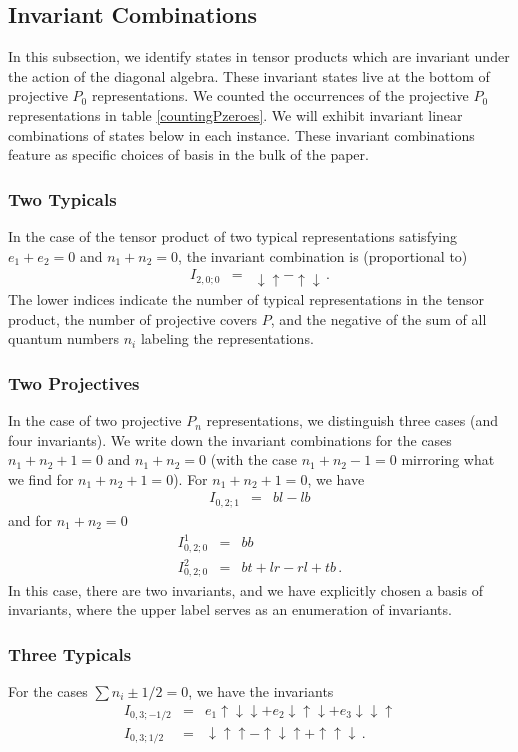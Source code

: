 \documentclass[12pt]{article}
\numberwithin{equation}{section}
\numberwithin{equation}{section}
\numberwithin{table}{section}\setlength{\multlinegap}{25pt}
\begin{document}
\subsection{Invariant Combinations}
\label{topandinvariants}
In this subsection, we identify states in tensor products which are invariant under the action of the diagonal
algebra. These invariant states live at the bottom of projective $P_0$ representations.  We counted the
occurrences of the projective $P_0$ representations in table \ref{countingPzeroes}. We will exhibit 
invariant linear combinations of states below in each instance. These invariant combinations feature as  specific choices of basis in
the bulk of the paper.
\subsubsection{Two Typicals}
In the case of the tensor product of two typical representations satisfying $e_1+e_2=0$
and $n_1+n_2=0$, the invariant combination is (proportional to)
\begin{eqnarray}
I_{2,0;0} &=& \downarrow \uparrow - \uparrow \downarrow \, .
\end{eqnarray}
The lower indices indicate the number of typical representations in the tensor product, the number of 
projective covers $P$, and the negative of the sum of all quantum numbers $n_i$ labeling the representations.
\subsubsection{Two Projectives}
In the case of two projective $P_n$ representations, we distinguish three cases (and four invariants). We write down the invariant combinations
for the cases $n_1+n_2+1=0$ and $n_1+n_2=0$ (with the case $n_1+n_2-1=0$ mirroring what we find for $n_1+n_2+1=0$). For $n_1+n_2+1=0$,
we have
\begin{eqnarray}
I_{0,2;1} &=& b l - l b
\end{eqnarray}
and for $n_1+n_2=0$
\begin{eqnarray}
I^1_{0,2;0} &=& b b
\nonumber \\
I^2_{0,2;0} &=& bt+lr-rl+tb \, .
\end{eqnarray}
In this case, there are two invariants, and we have explicitly chosen a basis of invariants, where the upper label serves
as an enumeration of invariants.
\subsubsection{Three Typicals}
For the cases $\sum n_i  \pm 1/2=0$, we have the invariants
\begin{eqnarray}
I_{0,3;-1/2} &=& e_1 \uparrow \downarrow \downarrow + e_2 \downarrow \uparrow \downarrow + e_3  \downarrow  \downarrow \uparrow
\nonumber \\
I_{0,3;1/2} &=& 
\downarrow \uparrow \uparrow -
\uparrow \downarrow  \uparrow + \uparrow  \uparrow \downarrow
\, .
\end{eqnarray}
\end{document}
